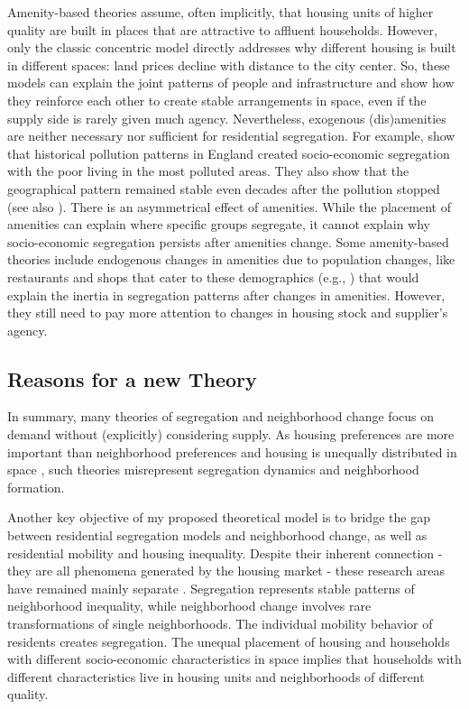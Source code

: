 Amenity-based theories assume, often implicitly, that housing units of higher quality are built in places that are attractive to affluent households. However, only the classic concentric model directly addresses why different housing is built in different spaces: land prices decline with distance to the city center. So, these models can explain the joint patterns of people and infrastructure and show how they reinforce each other to create stable arrangements in space, even if the supply side is rarely given much agency. Nevertheless, exogenous (dis)amenities are neither necessary nor sufficient for residential segregation. For example, \citet{heblichEastSideStoryHistorical2021} show that historical pollution patterns in England created socio-economic segregation with the poor living in the most polluted areas. They also show that the geographical pattern remained stable even decades after the pollution stopped (see also \cite{ruttenauerEnvironmentalInequalityResidential2021}). There is an asymmetrical effect of amenities. While the placement of amenities can explain where specific groups segregate, it cannot explain why socio-economic segregation persists after amenities change. Some amenity-based theories include endogenous changes in amenities due to population changes, like restaurants and shops that cater to these demographics (e.g., \cite{bruecknerWhyCentralParis1999}) that would explain the inertia in segregation patterns after changes in amenities. However, they still need to pay more attention to changes in housing stock and supplier's agency.


\subsection{Reasons for a new Theory}

In summary, many theories of segregation and neighborhood change focus on demand without (explicitly) considering supply. As housing preferences are more important than neighborhood preferences \citep{chauCriticalReviewLiterature2003, bayerEquilibriumModelSorting2004, mummoloWhyPartisansNot2017, delucaNotJustLateral2020} and housing is unequally distributed in space \citep{loufPatternsResidentialSegregation2016, oecdDividedCitiesUnderstanding2018, owensBuildingInequalityHousing2019}, such theories misrepresent segregation dynamics and neighborhood formation. 

Another key objective of my proposed theoretical model is to bridge the gap between residential segregation models and neighborhood change, as well as residential mobility and housing inequality. Despite their inherent connection - they are all phenomena generated by the housing market - these research areas have remained mainly separate \citep{hwangThingsChangeThings2016}. Segregation represents stable patterns of neighborhood inequality, while neighborhood change involves rare transformations of single neighborhoods. The individual mobility behavior of residents creates segregation. The unequal placement of housing and households with different socio-economic characteristics in space implies that households with different characteristics live in housing units and neighborhoods of different quality.

